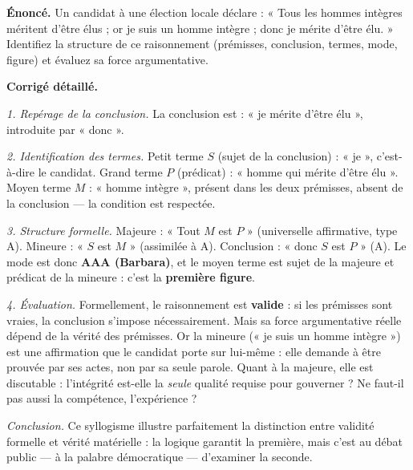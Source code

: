 \documentclass[11pt]{article}
\begin{document}
\begin{exoresolu}
\textbf{Énoncé.} Un candidat à une élection locale déclare : « Tous les hommes intègres méritent d'être élus ; or je suis un homme intègre ; donc je mérite d'être élu. » Identifiez la structure de ce raisonnement (prémisses, conclusion, termes, mode, figure) et évaluez sa force argumentative.

\tcblower
\textbf{Corrigé détaillé.}

\emph{1. Repérage de la conclusion.} La conclusion est : « je mérite d'être élu », introduite par « donc ».

\emph{2. Identification des termes.} Petit terme $S$ (sujet de la conclusion) : « je », c'est-à-dire le candidat. Grand terme $P$ (prédicat) : « homme qui mérite d'être élu ». Moyen terme $M$ : « homme intègre », présent dans les deux prémisses, absent de la conclusion — la condition est respectée.

\emph{3. Structure formelle.} Majeure : « Tout $M$ est $P$ » (universelle affirmative, type A). Mineure : « $S$ est $M$ » (assimilée à A). Conclusion : « donc $S$ est $P$ » (A). Le mode est donc \textbf{AAA (Barbara)}, et le moyen terme est sujet de la majeure et prédicat de la mineure : c'est la \textbf{première figure}.

\emph{4. Évaluation.} Formellement, le raisonnement est \textbf{valide} : si les prémisses sont vraies, la conclusion s'impose nécessairement. Mais sa force argumentative réelle dépend de la vérité des prémisses. Or la mineure (« je suis un homme intègre ») est une affirmation que le candidat porte sur lui-même : elle demande à être prouvée par ses actes, non par sa seule parole. Quant à la majeure, elle est discutable : l'intégrité est-elle la \emph{seule} qualité requise pour gouverner ? Ne faut-il pas aussi la compétence, l'expérience ?

\emph{Conclusion.} Ce syllogisme illustre parfaitement la distinction entre validité formelle et vérité matérielle : la logique garantit la première, mais c'est au débat public — à la palabre démocratique — d'examiner la seconde.
\end{exoresolu}
\end{document}
